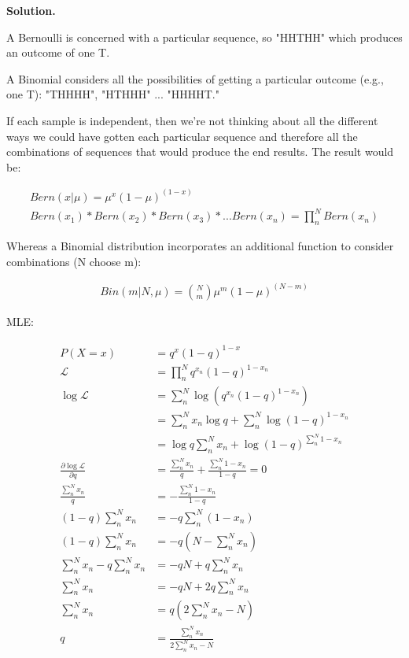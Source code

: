 \documentclass[10pt]{article}
\begin{document}
\begin{itemize}
{\bf Solution.} 

A Bernoulli is concerned with a particular sequence, so "HHTHH" which produces an outcome of one T.

A Binomial considers all the possibilities of getting a particular outcome (e.g., one T): "THHHH", "HTHHH" ... "HHHHT."

If each sample is independent, then we're not thinking about all the different ways we could have gotten each particular sequence and therefore all the combinations of sequences that would produce the end results. The result would be:

\begin{eqnarray*}
Bern(x|\mu) = \mu^x (1 - \mu)^{(1-x)}
\\
Bern(x_1) * Bern(x_2) * Bern(x_3) * ... Bern(x_n) = \prod_n^N Bern(x_n)
\end{eqnarray*}

Whereas a Binomial distribution incorporates an additional function to consider combinations (N choose m):

\begin{eqnarray*}
Bin(m|N,\mu) = {N \choose m} \mu^m (1 - \mu)^{(N-m)}
\end{eqnarray*}

MLE:

\begin{eqnarray*}
\begin{aligned}
P(X = x) &= q^x(1-q)^{1-x}
\\
\mathcal{L} &= \prod_n^N q^{x_n}(1-q)^{1-{x_n}}
\\
\log\mathcal{L} &= \sum_n^N \log \left( q^{x_n} (1-q)^{1-{x_n}} \right)
\\
&= \sum_n^N  x_n \log q + \sum_n^N \log (1-q)^{1-{x_n}}
\\
&= \log q \sum_n^N  x_n + \log (1-q)^{\sum_n^N 1-{x_n}}
\\
\frac { \partial \log\mathcal{L}} {\partial q} &= \frac{\sum_n^N x_n}{q} + \frac{\sum_n^N 1 - x_n}{1 - q} = 0
\\
\frac{\sum_n^N x_n}{q} &= - \frac{\sum_n^N 1-x_n}{1-q}
\\
(1-q)\sum_n^N x_n &= -q \sum_n^N (1-x_n)
\\
(1-q)\sum_n^N x_n &= -q (N - \sum_n^N x_n)
\\
\sum_n^N x_n - q \sum_n^N x_n &= -qN  + q \sum_n^N x_n
\\
\sum_n^N x_n  &= -qN + 2q \sum_n^N x_n
\\
\sum_n^N x_n  &= q (2 \sum_n^N x_n - N)
\\
q &= \frac{\sum_n^N x_n}{2 \sum_n^N x_n - N}
\end{aligned}
\end{eqnarray*}


\end{itemize}
\end{document}
